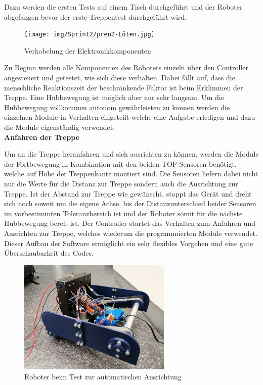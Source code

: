 Dazu werden die ersten Tests auf einem Tisch durchgeführt und der Roboter abgefangen bevor der erste Treppentest durchgeführt wird.

\begin{figure}[H]
  \texttt{[image: img/Sprint2/pren2-Löten.jpg]}
  \centering
  \caption{Verkabelung der Elektronikkomponenten}
  \label{fig:verkabelung-elektronik}
\end{figure}

\newpage

Zu Beginn werden alle Komponenten des Roboters einzeln über den Controller angesteuert und getestet, wie sich diese verhalten. Dabei fällt auf, dass die menschliche Reaktionszeit der beschränkende Faktor ist beim Erklimmen der Treppe. Eine Hubbewegung ist möglich aber nur sehr langsam. Um die Hubbewegung vollkommen autonom gewährleisten zu können werden die einzelnen Module in Verhalten eingeteilt welche eine Aufgabe erledigen und dazu die Module eigenständig verwendet.\\



\textbf{Anfahren der Treppe}

Um an die Treppe heranfahren und sich ausrichten zu können, werden die Module der Fortbewegung in Kombination mit den beiden TOF-Sensoren benötigt, welche auf Höhe der Treppenkante montiert sind. Die Sensoren liefern dabei nicht nur die Werte für die Distanz zur Treppe sondern auch die Ausrichtung zur Treppe. Ist der Abstand zur Treppe wie gewünscht, stoppt das Gerät und dreht sich noch soweit um die eigene Achse, bis der Distanzunterschied beider Sensoren im vorbestimmten Toleranzbereich ist und der Roboter somit für die nächste Hubbewegung bereit ist.
Der Controller startet das Verhalten zum Anfahren und Ausrichten zur Treppe, welches wiederum die programmierten Module verwendet. Dieser Aufbau der Software ermöglicht ein sehr flexibles Vorgehen und eine gute Überschaubarkeit des Codes.

\begin{figure}[H]
  \includegraphics[width=0.65\textwidth]{img/Sprint2/pren2_ausrichten-anfahren.jpg}
  \centering
  \caption{Roboter beim Test zur automatischen Ausrichtung}
  \label{fig:automatische-ausrichtung}
  \end{figure}
  
